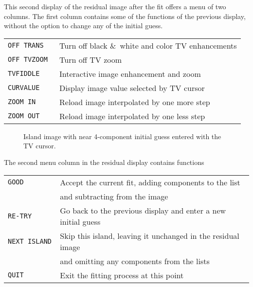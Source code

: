 \documentclass[twoside]{article}
\newcommand{\putfig}[1]{\texttt{[image: \#1.eps]}}
\begin{document}
This second display of the residual image after the fit offers a menu
of two columns.  The first column contains some of the functions of
the previous display, without the option to change any of the initial
guess.

\begin{center}
\begin{tabular}{|l|l|}\hline
 {\tt OFF TRANS   } & Turn off black \&\ white and color TV
                      enhancements\\
 {\tt OFF TVZOOM  } & Turn off TV zoom\\
 {\tt TVFIDDLE    } & Interactive image enhancement and zoom \\
 {\tt CURVALUE    } & Display image value selected by TV cursor \\
 {\tt ZOOM IN     } & Reload image interpolated by one more step \\
 {\tt ZOOM OUT    } & Reload image interpolated by one less step \\ \hline
\end{tabular}
\end{center}

\begin{figure}
\begin{center}
\resizebox{6.0in}{!}{\putfig{TVSAD.3}}
\caption{Island image with near 4-component initial guess entered with
  the TV cursor.}
\label{fig:TVSAD.newguess}
\end{center}
\end{figure}

The second menu column in the residual display contains functions

\begin{center}
\begin{tabular}{|l|l|}\hline
 {\tt GOOD        } & Accept the current fit, adding components to the
                      list \\
 {\tt             } & and subtracting from the image \\
 {\tt RE-TRY      } & Go back to the previous display and enter a new
                      initial guess \\
 {\tt NEXT ISLAND } & Skip this island, leaving it unchanged in the
                      residual image\\
 {\tt             } &  and omitting any components from the lists \\
 {\tt QUIT        } & Exit the fitting process at this point \\ \hline
\end{tabular}
\end{center}
\end{document}
